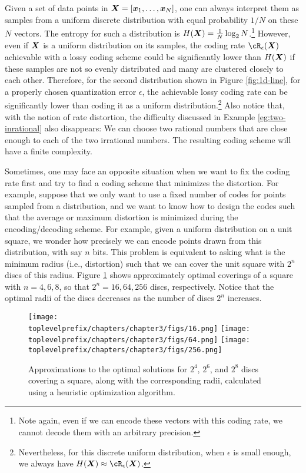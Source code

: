 \documentclass[../../book-main.tex]{subfiles}
\begin{document}
\begin{remark}
    Given a set of data points in $\bm{X} = [\bm{x}_1,\ldots, \bm{x}_N]$, one can always
	interpret them as samples from a uniform discrete distribution with equal
	probability $1/N$ on these $N$ vectors. The entropy for such a distribution
	is $H(\bm{X}) = \frac{1}{N}\log_2 N$.\footnote{Note again, even if we can encode
	these vectors with this coding rate, we cannot decode them with an arbitrary
	precision.} However, even if $\bm{X}$ is  a uniform distribution on its samples,
	the coding rate $\cR_{\epsilon}(\X)$ achievable with a lossy coding scheme
	could be significantly lower than $H(\bm{X})$ if these samples are not so evenly
	distributed and many are clustered closely to each other. Therefore, for the
	second distribution shown in Figure \ref{fig:1d-line}, for a properly chosen
	quantization error  $\epsilon$, the achievable lossy coding rate can be
	significantly lower than coding it as a uniform
	distribution.\footnote{Nevertheless, for this discrete uniform distribution,
	when $\epsilon$ is small enough, we always have $H(\X) \approx \cR_{\epsilon}(\X)$.} Also notice that, with the notion of rate distortion, the difficulty discussed in Example \ref{eg:two-inrational} also disappears: We can choose two rational numbers that are close enough to each of the two irrational numbers. The resulting coding scheme will have a finite complexity. 
\end{remark}

\begin{example}\label{example:sphere-covering-rate-distortion}
	Sometimes, one may face an opposite situation when we want to fix the coding
	rate first and try to find a coding scheme that minimizes the distortion.
	For example, suppose that we only want to use a fixed number of codes for
	points sampled from a distribution, and we want to know how to design the
	codes such that the average or maximum distortion is minimized during the
	encoding/decoding scheme. For example, given a uniform distribution on
	a unit square, we wonder how precisely we can encode points drawn from this
	distribution, with say $n$ bits. This problem is equivalent to asking what
	is the minimum radius (i.e., distortion) such that we can cover the unit
	square with $2^n$ discs of this radius. Figure
	\ref{fig:seven-circles-packing} shows approximately optimal coverings of
	a square with \(n = 4, 6, 8\), so that \(2^{n} = 16, 64, 256\) discs, respectively. Notice that the optimal radii of the discs decreases as the number of discs \(2^{n}\) increases.
	\begin{figure}
		\centering
		\texttt{[image: \\toplevelprefix/chapters/chapter3/figs/16.png]}
		\hfill
		\texttt{[image: \\toplevelprefix/chapters/chapter3/figs/64.png]}
		\hfill
		\texttt{[image: \\toplevelprefix/chapters/chapter3/figs/256.png]}

		\caption{Approximations to the optimal solutions for \(2^{4}\),
		\(2^{6}\), and \(2^{8}\) discs covering a square, along with the
		corresponding radii, calculated using a heuristic optimization algorithm.}
		\label{fig:seven-circles-packing}
	\end{figure}
\end{example}
\end{document}
